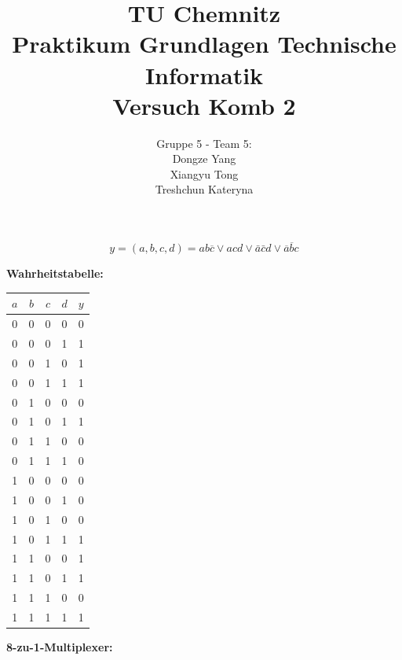 \documentclass[fleqn]{article}
\title{TU Chemnitz \\ Praktikum Grundlagen Technische Informatik \\ Versuch Komb 2}
\author{Gruppe 5 - Team 5: \\ Dongze Yang \\Xiangyu Tong \\ Treshchun Kateryna}
\begin{document}
\maketitle



\pagestyle{main}

$$y = (a,b,c,d) = ab\overline{c}\vee acd \vee \bar{a}\bar{c}d \vee \overline{a}\overline{b}c$$

\textbf{Wahrheitstabelle:}

\begin{center}
\begin{tabular}{cccc|c}
    $a$ & $b$ & $c$ & $d$ & $y$\\
    \hline
    0&0&0&0&0\\
    0&0&0&1&1\\
    0&0&1&0&1\\
    0&0&1&1&1\\
    \hline
    0&1&0&0&0\\
    0&1&0&1&1\\
    0&1&1&0&0\\
    0&1&1&1&0\\
    \hline
    1&0&0&0&0\\
    1&0&0&1&0\\
    1&0&1&0&0\\
    1&0&1&1&1\\
    \hline
    1&1&0&0&1\\
    1&1&0&1&1\\
    1&1&1&0&0\\
    1&1&1&1&1\\
\end{tabular}
\end{center}

\textbf{8-zu-1-Multiplexer:}
\end{document}
